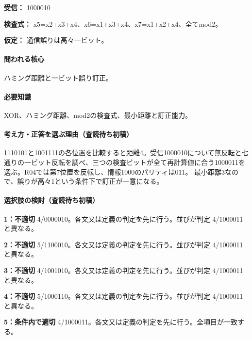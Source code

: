 \noindent\textbf{受信：} 1000010\par

\noindent\textbf{検査式：} x5=\allowbreak{}x2+x3+x4、x6=\allowbreak{}x1+x3+x4、x7=\allowbreak{}x1+x2+x4、全てmod2。\par

\noindent\textbf{仮定：} 通信誤りは高々一ビット。\par

\paragraph{問われる核心} ハミング距離と一ビット誤り訂正。

\paragraph{必要知識} XOR、ハミング距離、mod2の検査式、最小距離と訂正能力。

\paragraph{考え方・正答を選ぶ理由（査読待ち初稿）} 1110101と1001111の各位置を比較すると距離4。受信1000010について無反転と七通りの一ビット反転を調べ、三つの検査ビットが全て再計算値に合う1000011を選ぶ。R04では第7位置を反転し、情報1000のパリティは011。 最小距離3なので、誤りが高々1という条件下で訂正が一意になる。

\paragraph{選択肢の検討（査読待ち初稿）}\mbox{}\par

\noindent\textbf{1：不適切} 4/0000010。各文又は定義の判定を先に行う。並びが判定 4/1000011 と異なる。\par

\noindent\textbf{2：不適切} 5/1100010。各文又は定義の判定を先に行う。並びが判定 4/1000011 と異なる。\par

\noindent\textbf{3：不適切} 4/1001010。各文又は定義の判定を先に行う。並びが判定 4/1000011 と異なる。\par

\noindent\textbf{4：不適切} 5/1000110。各文又は定義の判定を先に行う。並びが判定 4/1000011 と異なる。\par

\noindent\textbf{5：条件内で適切} 4/1000011。各文又は定義の判定を先に行う。全項目が一致する。\par

